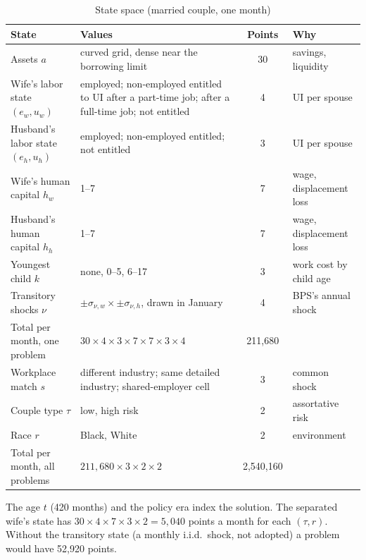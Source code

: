 \documentclass[11pt]{article}
\newcommand{\1}{\mathbf{1}}
\begin{document}
\begin{table}[htbp]\centering\small
\caption{State space (married couple, one month)}\label{tab:state}
\begin{tabular}{L{4.2cm}L{5.2cm}cL{3.6cm}}
\toprule
State & Values & Points & Why \\
\midrule
Assets $a$ & curved grid, dense near the borrowing limit & 30 & savings, liquidity \\
Wife's labor state $(e_w, u_w)$ & employed; non-employed entitled to UI after a part-time job; after a full-time job; not entitled & 4 & UI per spouse \\
Husband's labor state $(e_h, u_h)$ & employed; non-employed entitled; not entitled & 3 & UI per spouse \\
Wife's human capital $h_w$ & 1--7 & 7 & wage, displacement loss \\
Husband's human capital $h_h$ & 1--7 & 7 & wage, displacement loss \\
Youngest child $k$ & none, 0--5, 6--17 & 3 & work cost by child age \\
Transitory shocks $\nu$ & $\pm\sigma_{\nu,w} \times \pm\sigma_{\nu,h}$, drawn in January & 4 & BPS's annual shock \\
\midrule
Total per month, one problem & $30 \times 4 \times 3 \times 7 \times 7 \times 3 \times 4$ & 211{,}680 & \\
\midrule
Workplace match $s$ & different industry; same detailed industry; shared-employer cell & 3 & common shock \\
Couple type $\tau$ & low, high risk & 2 & assortative risk \\
Race $r$ & Black, White & 2 & environment \\
\midrule
Total per month, all problems & $211{,}680 \times 3 \times 2 \times 2$ & 2{,}540{,}160 & \\
\bottomrule
\end{tabular}
\begin{minipage}{0.95\textwidth}\footnotesize The age $t$ (420 months) and the policy era index the solution. The
separated wife's state has $30 \times 4 \times 7 \times 3 \times 2 = 5{,}040$ points a month for each $(\tau, r)$.
Without the transitory state (a monthly i.i.d.\ shock, not adopted) a problem would have 52{,}920 points.\end{minipage}
\end{table}
\end{document}
